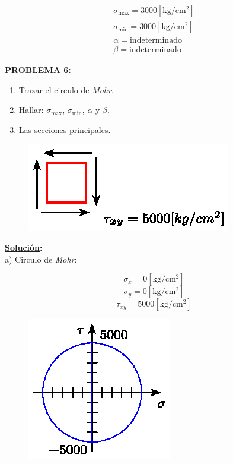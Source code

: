 \documentclass[letter,10pt,twoside]{article}
\begin{document}
\begin{equation*}
\boxed{
    \begin{array}{l}
        \sigma_{\text{max}} = 3000[\text{kg}/\text{cm}^2] \\
        \sigma_{\text{min}} = 3000[\text{kg}/\text{cm}^2] \\
        \alpha = \text{indeterminado} \\
        \beta = \text{indeterminado}
    \end{array}
}
\end{equation*}

\newpage

\colorbox{blue!25}{\textbf{PROBLEMA 6:}}

\begin{enumerate}[label=\alph*)]
    \item Trazar el circulo de \emph{Mohr}.
    \item Hallar: $\sigma_{\text{max}}$, $\sigma_{\text{min}}$, $\alpha$ y
        $\beta$.
    \item Las secciones principales.
\end{enumerate}

\begin{figure}[H]
\centering
\includegraphics[scale=1.2]{resources/f60.eps}
\end{figure}

\textbf{\underline{Solución}:} \\

a) Circulo de \emph{Mohr}:

\begin{equation*}
    \sigma_x = 0[\text{kg}/\text{cm}^2]
\end{equation*}
\begin{equation*}
    \sigma_y = 0[\text{kg}/\text{cm}^2]
\end{equation*}
\begin{equation*}
    \tau_{xy} = 5000[\text{kg}/\text{cm}^2]
\end{equation*}

\begin{figure}[H]
\centering
\includegraphics[scale=1.2]{resources/f61.eps}
\end{figure}
\end{document}
